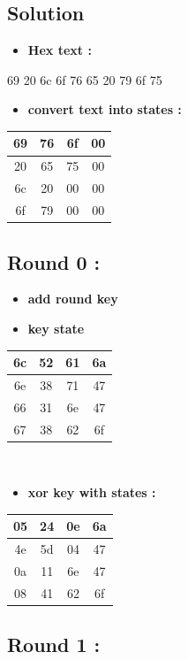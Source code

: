 \documentclass{article}
\begin{document}
\subsection*{Solution}
\begin{itemize}
    \item \textbf{Hex text :}\\
\end{itemize}69 20 6c 6f 76 65 20 79 6f 75 \begin{itemize}
    \item \textbf{convert text into states :}
\end{itemize}\begin{tabular}{|c|c|c|c|}
\hline 69 & 76 & 6f & 00 \\ \hline 20 & 65 & 75 & 00 \\ \hline 6c & 20 & 00 & 00 \\ \hline 6f & 79 & 00 & 00 \\ \hline \end{tabular}\hspace{0.5cm}\vspace{0.1cm}\subsection*{Round 0 : }\begin{itemize}
    \item \textbf{add round key} \\
\end{itemize}\begin{itemize}
    \item \textbf{key state} \\
\end{itemize}\begin{tabular}{|c|c|c|c|}
\hline 6c & 52 & 61 & 6a \\ \hline 6e & 38 & 71 & 47 \\ \hline 66 & 31 & 6e & 47 \\ \hline 67 & 38 & 62 & 6f \\ \hline \end{tabular}\hspace{0.5cm}\vspace{0.1cm}\\\begin{itemize}
    \item \textbf{xor key with states :}
\end{itemize}\begin{tabular}{|c|c|c|c|}
\hline 05 & 24 & 0e & 6a \\ \hline 4e & 5d & 04 & 47 \\ \hline 0a & 11 & 6e & 47 \\ \hline 08 & 41 & 62 & 6f \\ \hline \end{tabular}\hspace{0.5cm}\vspace{0.1cm}\subsection*{Round 1 : }\begin{itemize}

\end{itemize}
\end{document}
